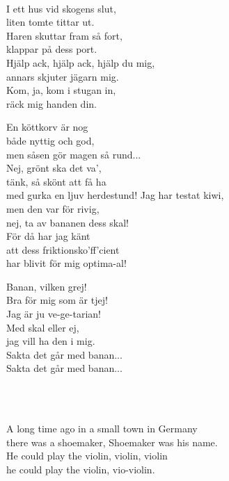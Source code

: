 \melo{}\\

\songtext{}I ett hus vid skogens slut,\\
liten tomte tittar ut.\\
Haren skuttar fram så fort,\\
klappar på dess port.\\
Hjälp ack, hjälp ack, hjälp du mig,\\
annars skjuter jägarn mig.\\
Kom, ja, kom i stugan in,\\
räck mig handen din.

En köttkorv är nog\\
både nyttig och god,\\
men såsen gör magen så rund...\\
Nej, grönt ska det va',\\
tänk, så skönt att få ha\\
med gurka en ljuv herdestund!
\newpage
Jag har testat kiwi,\\
men den var för rivig,\\
nej, ta av bananen dess skal!\\
För då har jag känt\\
att dess friktionsko'ff'cient\\
har blivit för mig optima-al!

Banan, vilken grej!\\
Bra för mig som är tjej!\\
Jag är ju ve-ge-tarian!\\
Med skal eller ej,\\
jag vill ha den i mig.\\
Sakta det går med banan...\\
Sakta det går med banan...

 \\


 \\       

\songtext{}
A long time ago in a small town in Germany\\
there was a shoemaker, Shoemaker was his name.\\
He could play the violin, violin, violin\\
he could play the violin, vio-violin.

